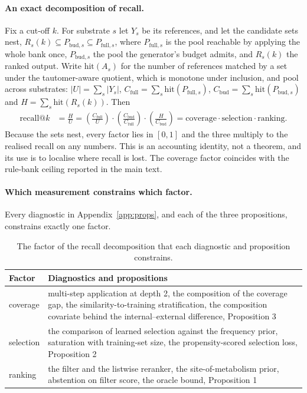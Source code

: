 \paragraph{An exact decomposition of recall.}
Fix a cut-off $k$. For substrate $s$ let $Y_s$ be its references, and let the candidate sets nest,
$R_s(k) \subseteq P_{\text{bud},s} \subseteq P_{\text{full},s}$, where $P_{\text{full},s}$ is the
pool reachable by applying the whole bank once, $P_{\text{bud},s}$ the pool the generator's budget
admits, and $R_s(k)$ the ranked output. Write $\text{hit}(A_s)$ for the number of references
matched by a set under the tautomer-aware quotient, which is monotone under inclusion, and pool
across substrates: $|U|=\sum_{s}|Y_s|$, $C_{\text{full}}=\sum_s\text{hit}(P_{\text{full},s})$,
$C_{\text{bud}}=\sum_s\text{hit}(P_{\text{bud},s})$ and $H=\sum_s\text{hit}(R_s(k))$. Then
\begin{align*}
\text{recall@}k &= \frac{H}{U}
= \left(\frac{C_{\text{full}}}{U}\right)
\cdot \left(\frac{C_{\text{bud}}}{C_{\text{full}}}\right)
\cdot \left(\frac{H}{C_{\text{bud}}}\right)
= \text{coverage} \cdot \text{selection} \cdot \text{ranking}.
\end{align*}
Because the sets nest, every factor lies in $[0,1]$ and the three multiply to the realised recall
on any numbers. This is an accounting identity, not a theorem, and its use is to localise
where recall is lost. The coverage factor coincides with the rule-bank ceiling reported in the
main text.


\paragraph{Which measurement constrains which factor.}
Every diagnostic in Appendix~\ref{app:props}, and each of the three propositions, constrains
exactly one factor.

\begin{table}[h]
\centering
\caption{The factor of the recall decomposition that each diagnostic and proposition constrains.}
\label{tab:factor-map}
\begin{tabular}{l p{9.5cm}}
\toprule
Factor & Diagnostics and propositions \\
\midrule
coverage & multi-step application at depth 2, the composition of the coverage gap, the
similarity-to-training stratification, the composition covariate behind the internal--external
difference, Proposition 3 \\
selection & the comparison of learned selection against the frequency prior, saturation with
training-set size, the propensity-scored selection loss, Proposition 2 \\
ranking & the filter and the listwise reranker, the site-of-metabolism prior, abstention on filter
score, the oracle bound, Proposition 1 \\
\bottomrule
\end{tabular}
\end{table}
